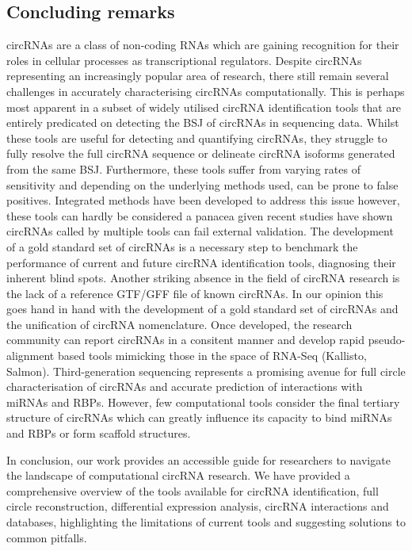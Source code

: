 \subsection{Concluding remarks}
circRNAs are a class of non-coding RNAs which are gaining recognition for their roles in cellular processes as transcriptional regulators. Despite circRNAs representing an increasingly popular area of research, there still remain several challenges in accurately characterising circRNAs computationally. This is perhaps most apparent in a subset of widely utilised circRNA identification tools that are entirely predicated on detecting the BSJ of circRNAs in sequencing data. Whilst these tools are useful for detecting and quantifying circRNAs, they struggle to fully resolve the full circRNA sequence or delineate circRNA isoforms generated from the same BSJ. Furthermore, these tools suffer from varying rates of sensitivity and depending on the underlying methods used, can be prone to false positives. Integrated methods have been developed to address this issue however, these tools can hardly be considered a panacea given recent studies have shown circRNAs called by multiple tools can fail external validation. The development of a gold standard set of circRNAs is a necessary step to benchmark the performance of current and future circRNA identification tools, diagnosing their inherent blind spots. Another striking absence in the field of circRNA research is the lack of a reference GTF/GFF file of known circRNAs. In our opinion this goes hand in hand with the development of a gold standard set of circRNAs and the unification of circRNA nomenclature. Once developed, the research community can report circRNAs in a consitent manner and develop rapid pseudo-alignment based tools mimicking those in the space of RNA-Seq (Kallisto\cite{kallisto}, Salmon\cite{Salmon}). Third-generation sequencing represents a promising avenue for full circle characterisation of circRNAs and accurate prediction of interactions with miRNAs and RBPs. However, few computational tools consider the final tertiary structure of circRNAs which can greatly influence its capacity to bind miRNAs and RBPs or form scaffold structures. \par
In conclusion, our work provides an accessible guide for researchers to navigate the landscape of computational circRNA research. We have provided a comprehensive overview of the tools available for circRNA identification, full circle reconstruction, differential expression analysis, circRNA interactions and databases, highlighting the limitations of current tools and suggesting solutions to common pitfalls. \par
